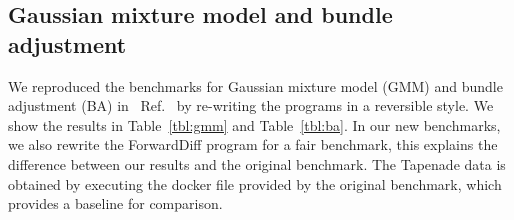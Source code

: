 \documentclass{article}
\newcommand{\<}{\langle}
\renewcommand{\>}{\rangle}
\newcommand{\Ref}[1]{Ref.~\cite{#1}}
\newcommand{\Tbl}[1]{Table~\ref{#1}}
\newcommand{\ra}[1]{\renewcommand{\arraystretch}{#1}}
\theoremstyle{definition}\newtheorem{definition}{\textit{Definition}}
\begin{document}
\subsection{Gaussian mixture model and bundle adjustment}\label{sec:ba}

We reproduced the benchmarks for Gaussian mixture model (GMM) and bundle adjustment (BA) in ~\Ref{Srajer2018} by re-writing the programs in a reversible style. We show the results in \Tbl{tbl:gmm} and \Tbl{tbl:ba}. In our new benchmarks, we also rewrite the ForwardDiff program for a fair benchmark, this explains the difference between our results and the original benchmark. The Tapenade data is obtained by executing the docker file provided by the original benchmark, which provides a baseline for comparison.

\begin{table}[h!]\centering
    \scriptsize
\begin{minipage}{\columnwidth}
\ra{1.3}
    \caption{Absolute runtimes in seconds for computing the objective (O) and gradients (G) of GMM with 10k data points. ``-'' represents missing data due to not finishing the computing in limited time.}\label{tbl:gmm}
\end{minipage}
\end{table}
\end{document}
